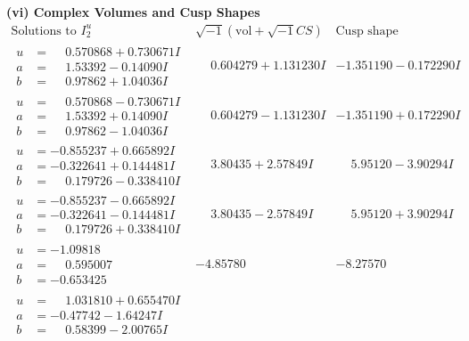 \documentclass[1p]{elsarticle_modified}
\theoremstyle{definition}
\newcommand{\I}{\sqrt{-1}}
\begin{document}
\newpage\flushleft \textbf{(vi) Complex Volumes and Cusp Shapes}
$$\begin{array}{c|c|c}  
\text{Solutions to }I^u_{2}& \I (\text{vol} + \sqrt{-1}CS) & \text{Cusp shape}\\
 \hline 
\begin{aligned}
u &= \phantom{-}0.570868 + 0.730671 I \\
a &= \phantom{-}1.53392 - 0.14090 I \\
b &= \phantom{-}0.97862 + 1.04036 I\end{aligned}
 & \phantom{-}0.604279 + 1.131230 I & -1.351190 - 0.172290 I \\ \hline\begin{aligned}
u &= \phantom{-}0.570868 - 0.730671 I \\
a &= \phantom{-}1.53392 + 0.14090 I \\
b &= \phantom{-}0.97862 - 1.04036 I\end{aligned}
 & \phantom{-}0.604279 - 1.131230 I & -1.351190 + 0.172290 I \\ \hline\begin{aligned}
u &= -0.855237 + 0.665892 I \\
a &= -0.322641 + 0.144481 I \\
b &= \phantom{-}0.179726 - 0.338410 I\end{aligned}
 & \phantom{-}3.80435 + 2.57849 I & \phantom{-}5.95120 - 3.90294 I \\ \hline\begin{aligned}
u &= -0.855237 - 0.665892 I \\
a &= -0.322641 - 0.144481 I \\
b &= \phantom{-}0.179726 + 0.338410 I\end{aligned}
 & \phantom{-}3.80435 - 2.57849 I & \phantom{-}5.95120 + 3.90294 I \\ \hline\begin{aligned}
u &= -1.09818\phantom{ +0.000000I} \\
a &= \phantom{-}0.595007\phantom{ +0.000000I} \\
b &= -0.653425\phantom{ +0.000000I}\end{aligned}
 & -4.85780\phantom{ +0.000000I} & -8.27570\phantom{ +0.000000I} \\ \hline\begin{aligned}
u &= \phantom{-}1.031810 + 0.655470 I \\
a &= -0.47742 - 1.64247 I \\
b &= \phantom{-}0.58399 - 2.00765 I\end{aligned}

\end{array}$$
\end{document}
